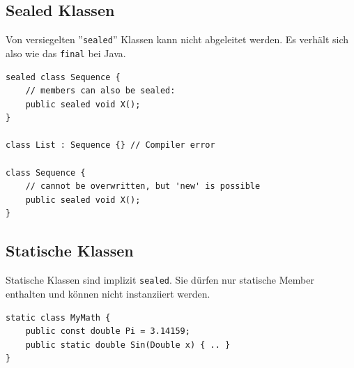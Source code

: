 \documentclass[
a4paper,
oneside,
10pt,
fleqn,
headsepline,
toc=listofnumbered, 
bibliography=totocnumbered]{scrartcl}
\begin{document}
\subsection{Sealed Klassen}
Von versiegelten ''\lstinline|sealed|'' Klassen kann nicht abgeleitet werden. Es verhält sich also wie das \lstinline|final| bei Java.
\begin{lstlisting}
sealed class Sequence {
	// members can also be sealed:
	public sealed void X();
}

class List : Sequence {} // Compiler error

class Sequence {
	// cannot be overwritten, but 'new' is possible
	public sealed void X();
}

\end{lstlisting}

\subsection{Statische Klassen}
Statische Klassen sind implizit \lstinline|sealed|. Sie dürfen nur statische Member enthalten und können nicht instanziiert werden.
\begin{lstlisting}
static class MyMath {
	public const double Pi = 3.14159;
	public static double Sin(Double x) { .. }
}
\end{lstlisting}
\clearpage
\end{document}
